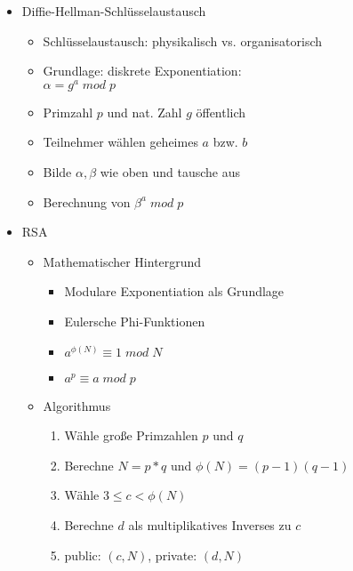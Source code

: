 \documentclass[11pt, paper=a4, twocolumn]{scrartcl}
\begin{document}
\begin{itemize}
		\item Diffie-Hellman-Schlüsselaustausch
			\begin{itemize}
				\item Schlüsselaustausch: physikalisch vs. organisatorisch
				\item Grundlage: diskrete Exponentiation:\\ 
					$\alpha = g^a\;mod\;p$
				\item Primzahl $p$ und nat. Zahl $g$ öffentlich
				\item Teilnehmer wählen geheimes $a$ bzw. $b$
				\item Bilde $\alpha,\beta$ wie oben und tausche aus
				\item Berechnung von $\beta^a\;mod\;p$
			\end{itemize}
		
		\item RSA
			\begin{itemize}
				\item Mathematischer Hintergrund
					\begin{itemize}
						\item Modulare Exponentiation als 
							Grundlage 
						\item Eulersche Phi-Funktionen
						\item $a^{\phi(N)}\equiv 1\;mod\;N$
						\item $a^p \equiv a\;mod\;p$
					\end{itemize}

				\item Algorithmus
					\begin{enumerate}
						\item Wähle große Primzahlen $p$ und $q$
						\item Berechne $N=p*q$ und 
							$\phi(N)=(p-1)(q-1)$
						\item Wähle $3\leq c<\phi(N)$
						\item Berechne $d$ als multiplikatives 
							Inverses zu $c$
						\item public: $(c,N)$, private: $(d,N)$
					\end{enumerate}

			\end{itemize}


\end{itemize}
\end{document}
